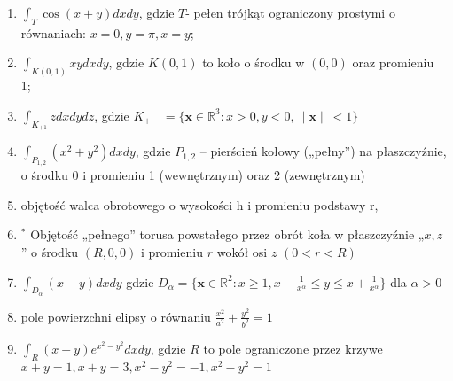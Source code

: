 \documentclass[a4paper,11pt]{article}
\newcommand{\RR}{\mathbb{R}}
\begin{document}
\begin{enumerate}
  \item $\int_T \cos(x+y) dxdy$, gdzie $T$- pełen trójkąt ograniczony
    prostymi o równaniach:  $x=0, y=\pi, x=y$;
  \item  $\int_{K(0,1)} xy dx dy$, gdzie  $K(0,1)$ to koło o środku w
    $(0,0)$ oraz promieniu 1;
  \item $\int_{K_{+1}} z dxdydz$, gdzie $K_{+-} = \{\bm{x} \in \RR^3:
    x>0, y<0, \|\bm{x}\| <1\} $
  \item $\int_{P_{1,2}} (x^2 + y^2) dxdy$, gdzie $P_{1,2}$ -- pierścień
    kołowy („pełny”) na płaszczyźnie, o środku
    0 i promieniu 1 (wewnętrznym) oraz 2 (zewnętrznym)
  \item objętość walca obrotowego o wysokości h i promieniu podstawy r,
  \item  $^\ast$ Objętość „pełnego” torusa powstałego przez obrót koła w
    płaszczyźnie „$x, z$” o
    środku $(R, 0, 0)$ i promieniu $r$ wokół osi $z$ $(0 < r < R)$
  \item $\int_{D_\alpha} (x-y) dxdy$ gdzie $D_\alpha = \{\bm{x} \in
      \RR^2: x\ge 1, x - \frac{1}{x^\alpha} \le y \le x +
    \frac{1}{x^\alpha}\}$ dla $\alpha > 0$
  \item pole powierzchni elipsy o równaniu $\frac{x^2}{a^2} +
    \frac{y^2}{b^2} = 1$
  \item $\int_{R} (x-y) e^{x^2 - y^2} dxdy$, gdzie $R$ to pole
    ograniczone przez krzywe  $x+y=1, x+y=3, x^2-y^2=-1, x^2-y^2=1$
\end{enumerate}
\end{document}
